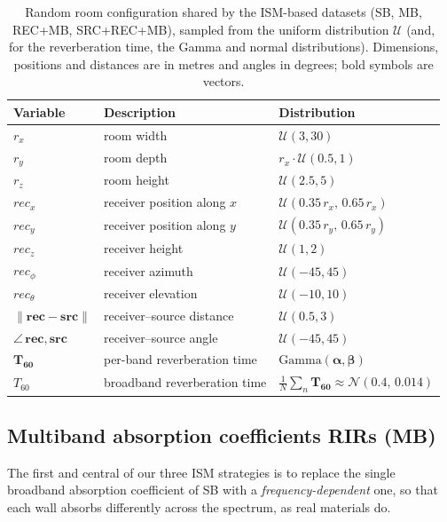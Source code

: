 \begin{table}[htbp]
\centering
\footnotesize
\caption{Random room configuration shared by the \acrshort{ISM}-based datasets
(SB, MB, REC+MB, SRC+REC+MB), sampled from the uniform distribution
$\mathcal{U}$ (and, for the reverberation time, the Gamma and normal
distributions). Dimensions, positions and distances are in metres and angles
in degrees; bold symbols are vectors.}
\label{tab:mbrirs_rooms}
\begin{tabular}{@{}lll@{}}
\toprule
Variable & Description & Distribution \\
\midrule
$r_x$ & room width  & $\mathcal{U}(3, 30)$ \\
$r_y$ & room depth  & $r_x \cdot \mathcal{U}(0.5, 1)$ \\
$r_z$ & room height & $\mathcal{U}(2.5, 5)$ \\[2pt]
$rec_x$ & receiver position along $x$ & $\mathcal{U}(0.35\,r_x,\, 0.65\,r_x)$ \\
$rec_y$ & receiver position along $y$ & $\mathcal{U}(0.35\,r_y,\, 0.65\,r_y)$ \\
$rec_z$ & receiver height             & $\mathcal{U}(1, 2)$ \\[2pt]
$rec_\phi$   & receiver azimuth   & $\mathcal{U}(-45, 45)$ \\
$rec_\theta$ & receiver elevation & $\mathcal{U}(-10, 10)$ \\[2pt]
$\lVert \boldsymbol{rec} - \boldsymbol{src} \rVert$ & receiver--source distance & $\mathcal{U}(0.5, 3)$ \\
$\angle\, \boldsymbol{rec}, \boldsymbol{src}$       & receiver--source angle    & $\mathcal{U}(-45, 45)$ \\[2pt]
$\boldsymbol{T_{60}}$ & per-band reverberation time & $\mathrm{Gamma}(\boldsymbol{\alpha}, \boldsymbol{\beta})$ \\
$T_{60}$              & broadband reverberation time & $\tfrac{1}{N}\sum_{n} \boldsymbol{T_{60}} \approx \mathcal{N}(0.4,\, 0.014)$ \\
\bottomrule
\end{tabular}
\end{table}


\subsection{Multiband absorption coefficients RIRs (MB)}
\label{ssec:mbrirs_mb}

The first and central of our three \acrshort{ISM} strategies is to replace the
single broadband absorption coefficient of SB with a
\emph{frequency-dependent} one, so that each wall absorbs differently across
the spectrum, as real materials do. 

